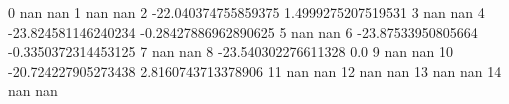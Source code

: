 0 nan nan
1 nan nan
2 -22.040374755859375 1.4999275207519531
3 nan nan
4 -23.824581146240234 -0.28427886962890625
5 nan nan
6 -23.87533950805664 -0.3350372314453125
7 nan nan
8 -23.540302276611328 0.0
9 nan nan
10 -20.724227905273438 2.8160743713378906
11 nan nan
12 nan nan
13 nan nan
14 nan nan
